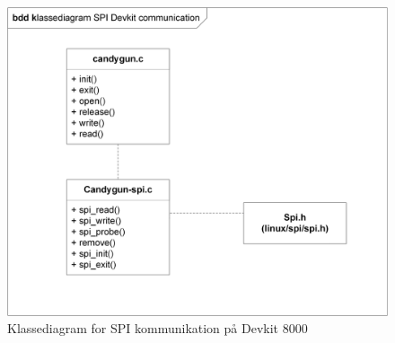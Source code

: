 \begin{figure}[H]
	\centering
	\includegraphics[width=\textwidth]{Afsnit/DesignOgImplementering/images/SPIklasse}
	\caption{Klassediagram for SPI kommunikation på Devkit 8000}
	\label{fig:spiklasse}
\end{figure}

